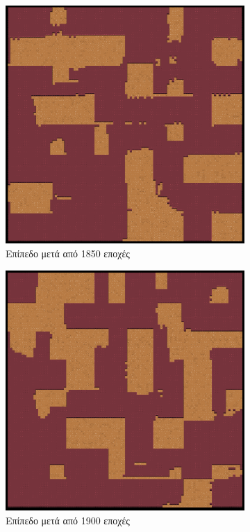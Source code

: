 \begin{figure}[H]
\begin{subfigure}{.5\textwidth}
  \centering
  \includegraphics[width=.8\linewidth]{../images/generated/1850.png}
  \caption{Επίπεδο μετά από 1850 εποχές}
  \label{fig:sfig1}
\end{subfigure}%
\begin{subfigure}{.5\textwidth}
  \centering
  \includegraphics[width=.8\linewidth]{../images/generated/1900.png}
  \caption{Επίπεδο μετά από 1900 εποχές}
  \label{fig:sfig2}
\end{subfigure}
\begin{subfigure}{.5\textwidth}

\end{subfigure}
\end{figure}
